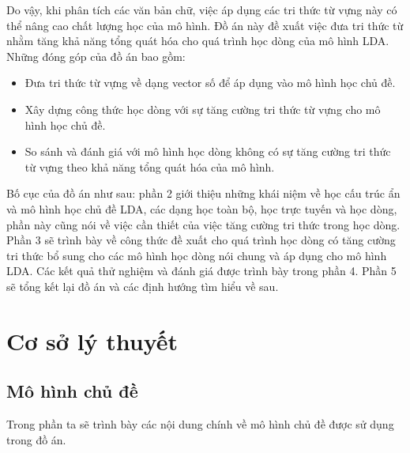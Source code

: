 \documentclass[fontsize=13pt]{scrartcl}
\begin{document}
\par 
Do vậy, khi phân tích các văn bản chữ, việc áp dụng các tri thức từ vựng này có thể nâng cao chất lượng học của mô hình. Đồ án này đề xuất việc đưa tri thức từ nhằm tăng khả năng tổng quát hóa cho quá trình học dòng của mô hình LDA. Những đóng góp của đồ án bao gồm:  
\begin{itemize}
\item Đưa tri thức từ vựng về dạng vector số để áp dụng vào mô hình học chủ đề.
\item Xây dựng công thức học dòng với sự tăng cường tri thức từ vựng cho mô hình học chủ đề.
\item So sánh và đánh giá với mô hình học dòng không có sự tăng cường tri thức từ vựng theo khả năng tổng quát hóa của mô hình.
\end{itemize} 
Bố cục của đồ án như sau: phần 2 giới thiệu những khái niệm về học cấu trúc ẩn và mô hình học chủ đề LDA, các dạng học toàn bộ, học trực tuyến và học dòng, phần này cũng nói về việc cần thiết của việc tăng cường tri thức trong học dòng. Phần 3 sẽ trình bày về công thức đề xuất cho quá trình học dòng có tăng cường tri thức bổ sung cho các mô hình học dòng nói chung và áp dụng cho mô hình LDA. Các kết quả thử nghiệm và đánh giá được trình bày trong phần 4. Phần 5 sẽ tổng kết lại đồ án và các định hướng tìm hiểu về sau.
\newpage
\section{Cơ sở lý thuyết}
\label{sec:partII}
	\subsection{Mô hình chủ đề}
	Trong phần ta sẽ trình bày các nội dung chính về mô hình chủ đề được sử dụng trong đồ án.
\end{document}
